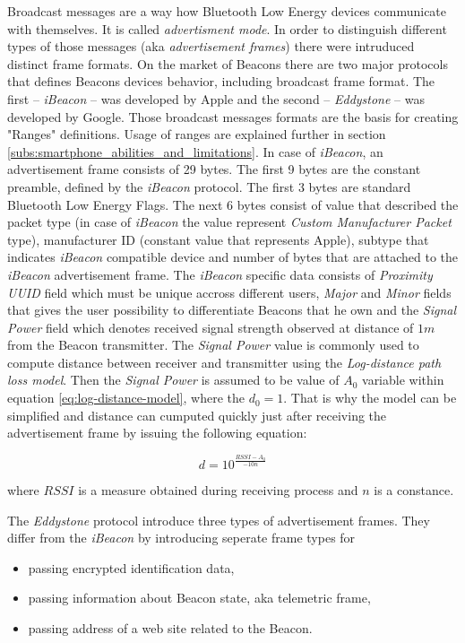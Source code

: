 \documentclass[../main.tex]{subfiles}
\begin{document}
Broadcast messages are a way how Bluetooth Low Energy devices communicate with themselves. It is called \textit{advertisment mode}. In order to distinguish different types of those messages (aka \textit{advertisement frames}) there were intruduced distinct frame formats. On the market of Beacons there are two major protocols that defines Beacons devices behavior, including broadcast frame format. The first -- \textit{iBeacon} -- was developed by Apple and the second -- \textit{Eddystone} -- was developed by Google. Those broadcast messages formats are the basis for creating "Ranges" definitions. Usage of ranges are explained further in section \ref{subs:smartphone_abilities_and_limitations}. In case of \textit{iBeacon}, an advertisement frame consists of 29 bytes. The first 9 bytes are the constant preamble, defined by the \textit{iBeacon} protocol. The first 3 bytes are standard Bluetooth Low Energy Flags. The next 6 bytes consist of value that described the packet type (in case of \textit{iBeacon} the value represent \textit{Custom Manufacturer Packet} type),  manufacturer ID (constant value that represents Apple), subtype that indicates \textit{iBeacon} compatible device and number of bytes that are attached to the \textit{iBeacon} advertisement frame. The \textit{iBeacon} specific data consists of \textit{Proximity UUID} field which must be unique accross different users, \textit{Major} and \textit{Minor} fields that gives the user possibility to differentiate Beacons that he own and the \textit{Signal Power} field which denotes received signal strength observed at distance of $1 m$ from the Beacon transmitter. The \textit{Signal Power} value is commonly used to compute distance between receiver and transmitter using the \textit{Log-distance path loss model}. Then the \textit{Signal Power} is assumed to be value of $A_0$ variable within equation \ref{eq:log-distance-model}, where the $d_0 = 1$. That is why the model can be simplified and distance can cumputed quickly just after receiving the advertisement frame by issuing the following equation:

\begin{equation}
	d = 10^{\frac{RSSI-A_0}{-10n}}
\end{equation}

where $RSSI$ is a measure obtained during receiving process and $n$ is a constance.

The \textit{Eddystone} protocol introduce three types of advertisement frames. They differ from the \textit{iBeacon} by introducing seperate frame types for
\begin{itemize}
	\item passing encrypted identification data,
	\item passing information about Beacon state, aka telemetric frame,
	\item passing address of a web site related to the Beacon.
\end{itemize}
\end{document}
